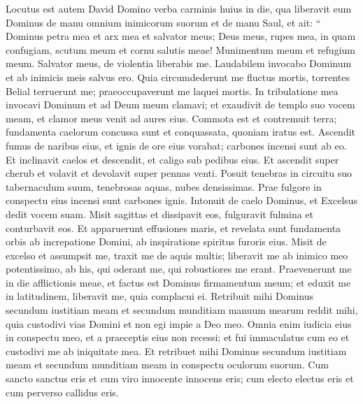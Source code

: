 \begin{biblechapter}
\begin{biblechapter}
\begin{biblechapter}
\begin{biblechapter}
\begin{biblechapter}
\begin{biblechapter}
\begin{biblechapter}
\begin{biblechapter}
\begin{biblechapter}
\begin{biblechapter}
\begin{biblechapter}
\begin{biblechapter}
\begin{biblechapter}
\begin{biblechapter}
\begin{biblechapter}
\begin{biblechapter}
\begin{biblechapter}
\begin{biblechapter}
\begin{biblechapter}
\begin{biblechapter}
\begin{biblechapter}
\begin{biblechapter}
\verse Locutus est autem David Domino verba carminis huius in die, qua liberavit eum Dominus de manu omnium inimicorum suorum et de manu Saul, 
\verse et ait:
 “ Dominus petra mea et arx mea et salvator meus;
 \verse Deus meus, rupes mea, in quam confugiam,
 scutum meum et cornu salutis meae!
 Munimentum meum et refugium meum.
 Salvator meus, de violentia liberabis me.
 \verse Laudabilem invocabo Dominum
 et ab inimicis meis salvus ero.
 \verse Quia circumdederunt me fluctus mortis,
 torrentes Belial terruerunt me;
 \verse praeoccupaverunt me laquei mortis.
 \verse In tribulatione mea invocavi Dominum
 et ad Deum meum clamavi;
 et exaudivit de templo suo vocem meam,
 et clamor meus venit ad aures eius. 
\verse Commota est et contremuit terra;
 fundamenta caelorum concussa sunt
 et conquassata, quoniam iratus est. 
\verse Ascendit fumus de naribus eius,
 et ignis de ore eius vorabat;
 carbones incensi sunt ab eo.
 \verse Et inclinavit caelos et descendit,
 et caligo sub pedibus eius.
 \verse Et ascendit super cherub et volavit
 et devolavit super pennas venti.
 \verse Posuit tenebras in circuitu suo tabernaculum suum,
 tenebrosas aquas, nubes densissimas.
 \verse Prae fulgore in conspectu eius
 incensi sunt carbones ignis.
 \verse Intonuit de caelo Dominus,
 et Excelsus dedit vocem suam.
 \verse Misit sagittas et dissipavit eos,
 fulguravit fulmina et conturbavit eos.
 \verse Et apparuerunt effusiones maris,
 et revelata sunt fundamenta orbis
 ab increpatione Domini,
 ab inspiratione spiritus furoris eius.
 \verse Misit de excelso et assumpsit me,
 traxit me de aquis multis;
 \verse liberavit me ab inimico meo potentissimo,
 ab his, qui oderant me, qui robustiores me erant.
 \verse Praevenerunt me in die afflictionis meae,
 et factus est Dominus firmamentum meum;
 \verse et eduxit me in latitudinem,
 liberavit me, quia complacui ei.
 \verse Retribuit mihi Dominus secundum iustitiam meam
 et secundum munditiam manuum mearum reddit mihi,
 \verse quia custodivi vias Domini
 et non egi impie a Deo meo.
 \verse Omnia enim iudicia eius in conspectu meo,
 et a praeceptis eius non recessi;
 \verse et fui immaculatus cum eo
 et custodivi me ab iniquitate mea.
 \verse Et retribuet mihi Dominus secundum iustitiam meam
 et secundum munditiam meam in conspectu oculorum suorum.
 \verse Cum sancto sanctus eris
 et cum viro innocente innocens eris;
 \verse cum electo electus eris
 et cum perverso callidus eris.

\end{biblechapter}
\end{biblechapter}
\end{biblechapter}
\end{biblechapter}
\end{biblechapter}
\end{biblechapter}
\end{biblechapter}
\end{biblechapter}
\end{biblechapter}
\end{biblechapter}
\end{biblechapter}
\end{biblechapter}
\end{biblechapter}
\end{biblechapter}
\end{biblechapter}
\end{biblechapter}
\end{biblechapter}
\end{biblechapter}
\end{biblechapter}
\end{biblechapter}
\end{biblechapter}
\end{biblechapter}
